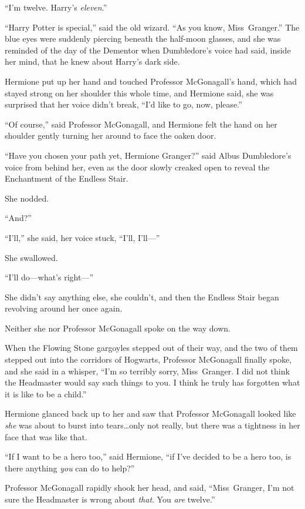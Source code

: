 “I’m twelve. Harry’s \emph{eleven}.”

“Harry Potter is special,” said the old wizard.
“As you know, Miss~Granger.” The blue eyes were suddenly piercing beneath the half-moon glasses, and she was reminded of the day of the Dementor when Dumbledore’s voice had said, inside her mind, that he knew about Harry’s dark side.

Hermione put up her hand and touched Professor McGonagall’s hand, which had stayed strong on her shoulder this whole time, and Hermione said, she was surprised that her voice didn’t break,
“I’d like to go, now, please.”

“Of course,” said Professor McGonagall, and Hermione felt the hand on her shoulder gently turning her around to face the oaken door.

“Have you chosen your path yet, Hermione Granger?” said Albus Dumbledore’s voice from behind her, even as the door slowly creaked open to reveal the Enchantment of the Endless Stair.

She nodded.

“And?”

“I’ll,” she said, her voice stuck,
“I’ll, I’ll—”

She swallowed.

“I’ll do—what’s right—”

She didn’t say anything else, she couldn’t, and then the Endless Stair began revolving around her once again.

Neither she nor Professor McGonagall spoke on the way down.

When the Flowing Stone gargoyles stepped out of their way, and the two of them stepped out into the corridors of Hogwarts, Professor McGonagall finally spoke, and she said in a whisper,
“I’m so terribly sorry, Miss~Granger. I did not think the Headmaster would say such things to you. I think he truly has forgotten what it is like to be a child.”

Hermione glanced back up to her and saw that Professor McGonagall looked like \emph{she} was about to burst into tears…only not really, but there was a tightness in her face that was like that.

“If I want to be a hero too,” said Hermione, “if I’ve decided to be a hero too, is there anything \emph{you} can do to help?”

Professor McGonagall rapidly shook her head, and said,
“Miss~Granger, I’m not sure the Headmaster is wrong about \emph{that}. You \emph{are} twelve.”

